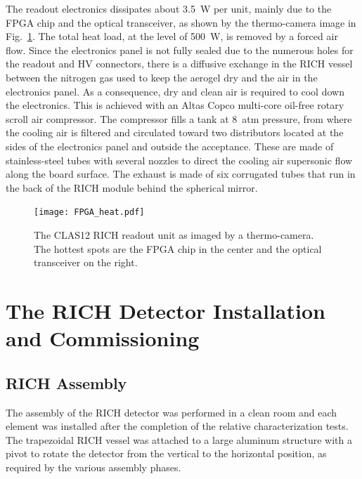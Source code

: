 \documentclass[5p,times,twocolumn]{elsarticle}
\begin{document}
The readout electronics dissipates about 3.5~W per unit, mainly due to the FPGA chip and the optical transceiver, as
shown by the thermo-camera image in Fig.~\ref{Fig:EleTile}. The total heat load, at the level of 500~W, is removed by
a forced air flow. Since the electronics panel is not fully sealed due to the numerous holes for the readout and HV
connectors, there is a diffusive exchange in the RICH vessel between the nitrogen gas used to keep the aerogel dry
and the air in the electronics panel. As a consequence, dry and clean air is required to cool down the electronics. This
is achieved with an Altas Copco multi-core oil-free rotary scroll air compressor. The compressor fills a tank at 8~atm
pressure, from where the cooling air is filtered and circulated toward two distributors located at the sides of the
electronics panel and outside the acceptance. These are made of stainless-steel tubes with several nozzles to direct
the cooling air supersonic flow along the board surface. The exhaust is made of six corrugated tubes that run in the
back of the RICH module behind the spherical mirror.

\begin{figure}[t]
\begin{center}
\texttt{[image: FPGA\_heat.pdf]}
\end{center}
\caption{The CLAS12 RICH readout unit as imaged by a thermo-camera. The hottest spots are the FPGA chip in the
  center and the optical transceiver on the right.}
\label{Fig:EleTile}
\end{figure}

\section{The RICH Detector Installation and Commissioning}

\subsection{RICH Assembly}


The assembly of the RICH detector was performed in a clean room and each element was installed after the completion
of the relative characterization tests. The trapezoidal RICH vessel was attached to a large aluminum structure with a
pivot to rotate the detector from the vertical to the horizontal position, as required by the various assembly phases.
\end{document}
